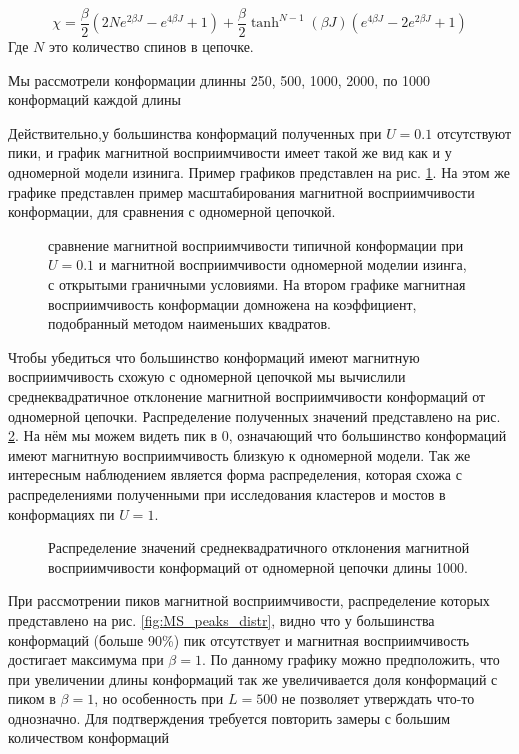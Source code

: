 \documentclass[14pt]{extarticle}
\begin{document}
\[
    \chi = \frac{\beta}{2} (2Ne^{2\beta J} - e^{4\beta J} + 1) + \frac{\beta}{2} \tanh^{N-1}(\beta J)(e^{4\beta J} - 2 e^{2\beta J} + 1)
\]
Где $N$ это количество спинов в цепочке. 

Мы рассмотрели конформации длинны 250, 500, 1000, 2000, по 1000 конформаций каждой длины

Действительно,у большинства конформаций полученных при $U=0.1$ отсутствуют пики, и график магнитной восприимчивости имеет такой же вид как и у одномерной модели изинига. Пример графиков представлен на рис. \ref{fig:MS_1D_comparison}. На этом же графике представлен пример масштабирования магнитной восприимчивости конформации, для сравнения с одномерной цепочкой.

\begin{figure}[ht]
	\centering
	
	\caption{сравнение магнитной восприимчивости типичной конформации при $U=0.1$ и магнитной восприимчивости одномерной моделии изинга, с открытыми граничными условиями. На втором графике магнитная восприимчивость конформации домножена на коэффициент, подобранный методом наименьших квадратов.}
	\label{fig:MS_1D_comparison}
\end{figure}


Чтобы убедиться что большинство конформаций имеют магнитную восприимчивость схожую с одномерной цепочкой мы вычислили среднеквадратичное отклонение магнитной восприимчивости конформаций от одномерной цепочки. Распределение полученных значений представлено на рис. \ref{fig:MS_1D_dif_distr}. На нём мы можем видеть пик в 0, означающий что большинство конформаций имеют магнитную восприимчивость близкую к одномерной модели. Так же интересным наблюдением является форма распределения, которая схожа с распределениями полученными при исследования кластеров и мостов в конформациях пи $U=1$.

\begin{figure}[ht]
	\centering
	
	\caption{Распределение значений среднеквадратичного отклонения магнитной восприимчивости конформаций от одномерной цепочки длины 1000.}
	\label{fig:MS_1D_dif_distr}
\end{figure}

При рассмотрении пиков магнитной восприимчивости, распределение которых представлено на рис. \ref{fig:MS_peaks_distr}, видно что у большинства конформаций (больше 90\%) пик отсутствует и магнитная восприимчивость достигает максимума при $\beta = 1$. По данному графику можно предположить, что при увеличении длины конформаций так же увеличивается доля конформаций с пиком в $\beta = 1$, но особенность при $L=500$ не позволяет утверждать что-то однозначно. Для подтверждения требуется повторить замеры с большим количеством конформаций
\end{document}
